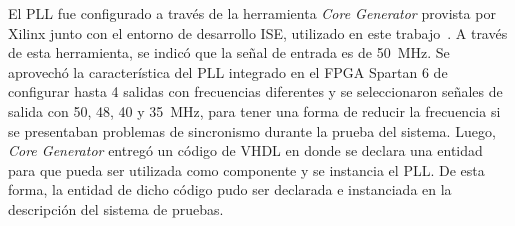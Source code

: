 		El PLL fue configurado a través de la herramienta {\it Core Generator} provista por Xilinx junto con el entorno de desarrollo ISE, utilizado en este trabajo~\cite{XilinxInc}. A través de esta herramienta, se indicó que la señal de entrada es de \SI{50}{\mega\hertz}. Se aprovechó la característica del PLL integrado en el FPGA Spartan 6 de configurar hasta 4 salidas con frecuencias diferentes y se seleccionaron señales de salida con \si{50}, \si{48}, \si{40} y \SI{35}{\mega\hertz}, para tener una forma de reducir la frecuencia si se presentaban problemas de sincronismo durante la prueba del sistema. Luego, {\it Core Generator} entregó un código de VHDL en donde se declara una entidad para que pueda ser utilizada como componente y se instancia el PLL. De esta forma, la entidad de dicho código pudo ser declarada e instanciada en la descripción del sistema de pruebas.
		
%		
%	
		
		
%	
		
